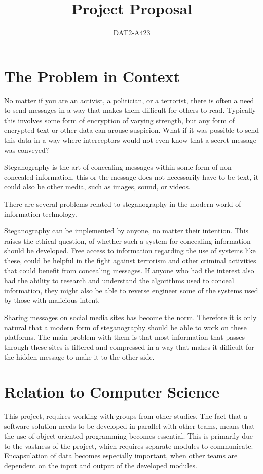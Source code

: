 \documentclass[a4paper,12pt,hidelinks]{article}
\newcommand{\group}{DAT2-A423}
\begin{document}
	\title{Project Proposal}
	\author{\group}
	\maketitle	
	\section*{The Problem in Context}
No matter if you are an activist, a politician, or a terrorist, there is often a need to send messages in a way that makes them difficult for others to read. Typically this involves some form of encryption of varying strength, but any form of encrypted text or other data can arouse suspicion. What if it was possible to send this data in a way where interceptors would not even know that a secret message was conveyed? 

Steganography is the art of concealing messages within some form of non-concealed information, this or the message does not necessarily have to be text, it could also be other media, such as images, sound, or videos.

There are several problems related to steganography in the modern world of information technology. 

Steganography can be implemented by anyone, no matter their intention. This raises the ethical question, of whether such a system for concealing information should be developed. Free access to information regarding the use of systems like these, could be helpful in the fight against terrorism and other criminal activities that could benefit from concealing messages. If anyone who had the interest also had the ability to research and understand the algorithms used to conceal information, they might also be able to reverse engineer some of the systems used by those with malicious intent.

Sharing messages on social media sites has become the norm. Therefore it is only natural that a modern form of steganography should be able to work on these platforms. The main problem with them is that most information that passes through these sites is filtered and compressed in a way that makes it difficult for the hidden message to make it to the other side.

	\section*{Relation to Computer Science}
This project, requires working with groups from other studies. The fact that a software solution needs to be developed in parallel with other teams, means that the use of object-oriented programming becomes essential. This is primarily due to the vastness of the project, which requires separate modules to communicate. Encapsulation of data becomes especially important, when other teams are dependent on the input and output of the developed modules.
	
\end{document}
